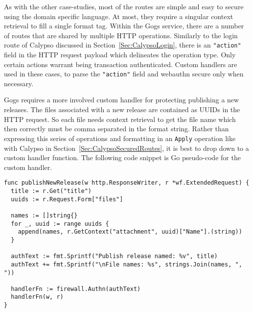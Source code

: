 As with the other case-studies, most of the routes are simple and easy to secure using the domain specific language. At most, they require a singular context retrieval to fill a single format tag. Within the Gogs service, there are a number of routes that are shared by multiple HTTP operations. Similarly to the login route of Calypso discussed in Section~\ref{Sec:CalypsoLogin}, there is an \lstinline{"action"} field in the HTTP request payload which delineates the operation type. Only certain actions warrant being transaction authenticated. Custom handlers are used in these cases, to parse the \lstinline{"action"} field and webauthn secure only when necessary.

Gogs requires a more involved custom handler for protecting publishing a new releases. The files associated with a new release are contained as UUIDs in the HTTP request. So each file needs context retrieval to get the file name which then correctly must be comma separated in the format string. Rather than expressing this series of operations and formatting in an \lstinline{Apply} operation like with Calypso in Section~\ref{Sec:CalypsoSecuredRoutes}, it is best to drop down to a custom handler function. The following code snippet is Go pseudo-code for the custom handler.

\begin{lstlisting}[float=h]
func publishNewRelease(w http.ResponseWriter, r *wf.ExtendedRequest) {
  title := r.Get("title")
  uuids := r.Request.Form["files"]

  names := []string{}
  for _, uuid := range uuids {
    append(names, r.GetContext("attachment", uuid)["Name"].(string))
  }

  authText := fmt.Sprintf("Publish release named: %v", title)
  authText += fmt.Sprintf("\nFile names: %s", strings.Join(names, ", "))

  handlerFn := firewall.Authn(authText)
  handlerFn(w, r)
}
\end{lstlisting}

